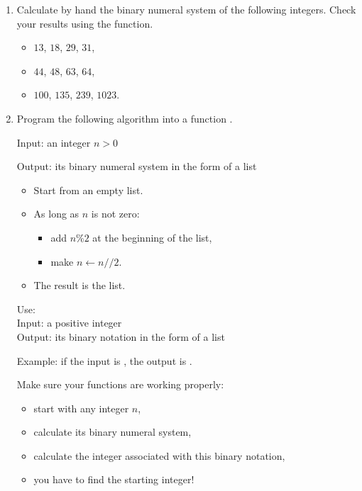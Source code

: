 \documentclass[11pt,class=report,crop=false]{standalone}
\begin{document}
\begin{activite}[]


\begin{enumerate}
  \item Calculate by hand the binary numeral system of the following integers. Check your results using the  \Python{} function.
  
   \begin{itemize}
    \item $13$, $18$, $29$, $31$,
    \item $44$, $48$, $63$, $64$,
    \item $100$, $135$, $239$, $1023$.
  \end{itemize} 
  
  \item
  Program the following algorithm into a function .

  \begin{algorithme}
  Input: an integer $n>0$

  Output: its binary numeral system in the form of a list

  \begin{itemize}
    \item Start from an empty list.
    
    \item As long as $n$ is not zero:
    
     \begin{itemize} 
       \item add $n \% 2$ at the beginning of the list,
       \item make $n \leftarrow n//2$.
     \end{itemize}    
         
    \item The result is the list.
  \end{itemize} 
             
 \end{algorithme}
 
   \begin{fonction}
  Use:  \\
  Input: a positive integer \\
  Output: its binary notation in the form of a list
  
  \medskip  
  Example: if the input is , the output is \ci{[1,1,0,0,1,1,0,0]}.
  \end{fonction} 
  
  Make sure your functions are working properly:
  \begin{itemize}
    \item start with any integer $n$,
    \item calculate its binary numeral system,
    \item calculate the integer associated with this binary notation,
    \item you have to find the starting integer!
  \end{itemize}
\end{enumerate}
\end{activite}
\end{document}
